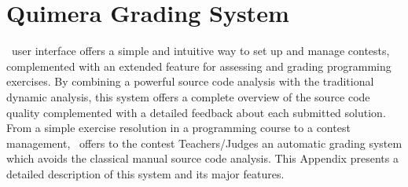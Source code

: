 
\chapter{Quimera Grading System}\label{a:quim}

\quim\ user interface offers a simple and intuitive way to set up and manage contests, complemented with an extended feature for assessing and grading programming exercises.
By combining a powerful source code analysis with the traditional dynamic analysis, this system offers a complete overview of the source code quality complemented with a
detailed feedback about each submitted solution.
From a simple exercise resolution in a programming course to a contest management, \quim\ offers to the contest Teachers/Judges an automatic grading system which avoids the classical manual source code analysis.
This Appendix presents a detailed description of this system and its major features.




